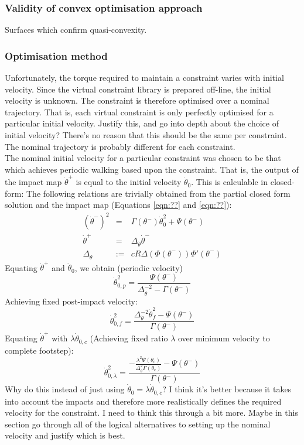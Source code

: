 \subsubsection{Validity of convex optimisation approach}
Surfaces which confirm quasi-convexity.

\subsubsection{Optimisation method}
Unfortunately, the torque required to maintain a constraint varies with initial velocity. Since the virtual constraint library is prepared off-line, the initial velocity is unknown. The constraint is therefore optimised over a nominal trajectory. That is, each virtual constraint is only perfectly optimised for a particular initial velocity. {\color{red} Justify this, and go into depth about the choice of initial velocity? There's no reason that this should be the same per constraint. The nominal trajectory is probably different for each constraint.} \\

The nominal initial velocity for a particular constraint was chosen to be that which achieves periodic walking based upon the constraint. That is, the output of the impact map $\dot{\theta}^+$ is equal to the initial velocity $\dot{\theta}_0$. This is calculable in closed-form: The following relations are trivially obtained from the partial closed form solution and the impact map (Equations \ref{eqn:??} and \ref{eqn:??}):
\begin{eqnarray}
	\left(\dot{\theta}^-\right)^2 &=& \Gamma(\theta^-)\dot{\theta}_0^2 + \Psi(\theta^-) \\
	\dot{\theta}^+ &=& \Delta_{\dot{\theta}}\dot{\theta}^- \\
	\Delta_{\dot{\theta}} &:=& cR\Delta(\Phi(\theta^-))\Phi'(\theta^-)
\end{eqnarray}
Equating $\dot{\theta}^+$ and $\dot{\theta}_0$, we obtain (periodic velocity)
\begin{equation}
	\dot{\theta}_{0,p}^2 = \frac{\Psi(\theta^-)}{\Delta_{\dot{\theta}}^{-2} - \Gamma(\theta^-)}
\end{equation}
Achieving fixed post-impact velocity:
\begin{equation}
	\dot{\theta}_{0,f}^2 = \frac{\Delta_{\dot{\theta}}^{-2}\dot{\theta}_f^2 - \Psi(\theta^-)} {\Gamma(\theta^-)}
\end{equation}
Equating $\dot{\theta}^+$ with $\lambda\dot{\theta}_{0,c}$ (Achieving fixed ratio $\lambda$ over minimum velocity to complete footstep):
\begin{equation}
	\dot{\theta}_{0,\lambda}^2 = \frac{-\frac{\lambda^2 \Psi(\theta_c)}{\Delta_{\dot{\theta}}^2 \Gamma(\theta_c)} - \Psi(\theta^-)} {\Gamma(\theta^-)}
\end{equation}
{\color{blue} Why do this instead of just using $\dot{\theta}_0 = \lambda\dot{\theta}_{0,c}$? I think it's better because it takes into account the impacts and therefore more realistically defines the required velocity for the constraint. I need to think this through a bit more. Maybe in this section go through all of the logical alternatives to setting up the nominal velocity and justify which is best.}

